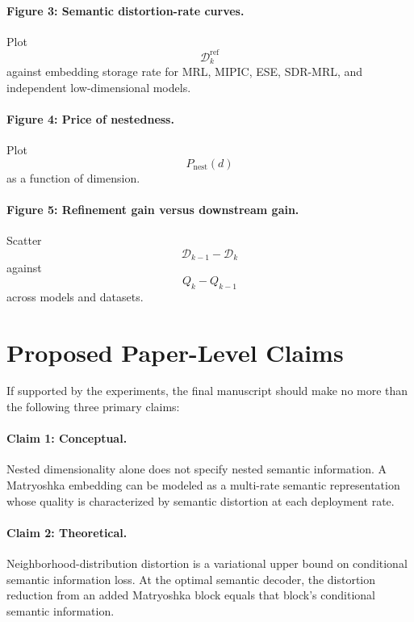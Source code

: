 \documentclass[11pt]{article}
\newcommand{\cD}{\mathcal{D}}
\begin{document}
\paragraph{Figure 3: Semantic distortion-rate curves.}
Plot
\begin{equation}
    \cD_k^{\mathrm{ref}}
\end{equation}
against embedding storage rate for MRL, MIPIC, ESE, SDR-MRL, and independent low-dimensional models.

\paragraph{Figure 4: Price of nestedness.}
Plot
\begin{equation}
    P_{\mathrm{nest}}(d)
\end{equation}
as a function of dimension.

\paragraph{Figure 5: Refinement gain versus downstream gain.}
Scatter
\begin{equation}
    \cD_{k-1}-\cD_k
\end{equation}
against
\begin{equation}
    Q_k-Q_{k-1}
\end{equation}
across models and datasets.


\section{Proposed Paper-Level Claims}

If supported by the experiments, the final manuscript should make no more than the following three primary claims:

\paragraph{Claim 1: Conceptual.}
Nested dimensionality alone does not specify nested semantic information.
A Matryoshka embedding can be modeled as a multi-rate semantic representation whose quality is characterized by semantic distortion at each deployment rate.

\paragraph{Claim 2: Theoretical.}
Neighborhood-distribution distortion is a variational upper bound on conditional semantic information loss.
At the optimal semantic decoder, the distortion reduction from an added Matryoshka block equals that block's conditional semantic information.
\end{document}
